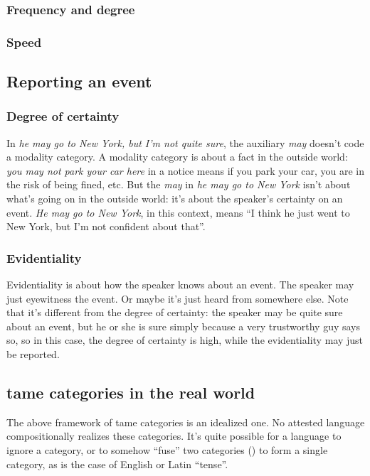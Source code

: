 \documentclass[UTF8, a4paper, oneside, scheme=plain]{ctexart}
\newcommand*{\corpus}[1]{\emph{#1}}
\newcommand{\classify}[1]{{\sc #1}}
\begin{document}
\subsubsection{Frequency and degree}

\subsubsection{Speed}

\subsection{Reporting an event}

\subsubsection{Degree of certainty}

In \corpus{he may go to New York, but I'm not quite sure},
the auxiliary \corpus{may} doesn't code a modality category.
A modality category is about a fact in the outside world:
\corpus{you may not park your car here} in a notice 
means if you park your car, 
you are in the risk of being fined, etc.
But the \corpus{may} in \corpus{he may go to New York} 
isn't about what's going on in the outside world:
it's about the speaker's certainty on an event.
\corpus{He may go to New York}, 
in this context, means 
``I think he just went to New York, 
but I'm not confident about that''.

\subsubsection{Evidentiality}

Evidentiality is about how the speaker knows about an event.
The speaker may just eyewitness the event.
Or maybe it's just heard from somewhere else.
Note that it's different from the degree of certainty:
the speaker may be quite sure about an event,
but he or she is sure simply because 
a very trustworthy guy says so,
so in this case, 
the degree of certainty is high,
while the evidentiality may just be \classify{reported}.

\subsection{\ac{tame} categories in the real world}

The above framework of \ac{tame} categories is an idealized one.
No attested language compositionally realizes these categories.
It's quite possible for a language to ignore a category,
or to somehow ``fuse'' two categories ()
to form a single category,
as is the case of English or Latin ``tense''.
\end{document}
